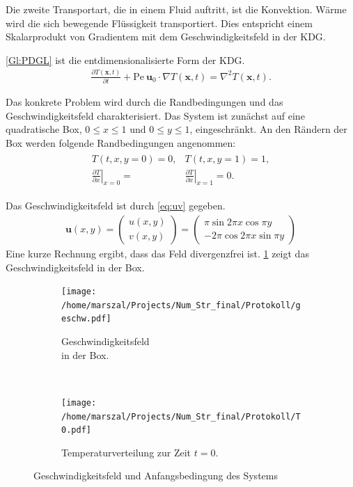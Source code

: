 Die zweite Transportart, die in einem Fluid auftritt, ist die Konvektion. Wärme wird die sich bewegende Flüssigkeit transportiert. Dies entspricht einem Skalarprodukt von Gradientem mit dem Geschwindigkeitsfeld in der KDG.

\cref{Gl:PDGL} ist die entdimensionalisierte Form der KDG.
\begin{align}
  \frac{\partial T(\boldsymbol x, t)}{\partial t} + \text{Pe}~ \boldsymbol{u}_0\cdot \nabla T(\boldsymbol x, t) = \nabla^2 T(\boldsymbol x, t). \label{Gl:PDGL}
\end{align}

Das konkrete Problem wird durch die Randbedingungen und das Geschwindigkeitsfeld charakterisiert.
Das System ist zunächst auf eine quadratische Box, $0\leq x \leq 1$ und $0\leq y \leq 1$, eingeschränkt.
An den Rändern der Box werden folgende Randbedingungen angenommen:
\begin{align}
  \begin{split}
  T(t,x,y=0) = 0, &  T(t,x,y=1)=1, \\
  \left.\frac{\partial T}{\partial x}\right|_{x=0} =& \left.\frac{\partial T}{\partial x}\right|_{x=1} = 0.
\end{split}
\end{align}

Das Geschwindigkeitsfeld ist durch \cref{eq:uv} gegeben.
\begin{align}
  \boldsymbol u(x,y) =
  \begin{pmatrix}
    u(x,y)\\
    v(x,y)
  \end{pmatrix} =
  \begin{pmatrix}
    \pi \sin{2\pi x}\cos{\pi y}\\
    -2\pi \cos{2\pi x}\sin{\pi y}
  \end{pmatrix}\label{eq:uv}
\end{align}
Eine kurze Rechnung ergibt, dass das Feld divergenzfrei ist. \cref{fig:uv} zeigt das Geschwindigkeitsfeld in der Box.
\begin{figure}
  \centering
  \begin{subfigure}[b]{0.45\textwidth}
  \texttt{[image: /home/marszal/Projects/Num\_Str\_final/Protokoll/geschw.pdf]}\caption{\centering Geschwindigkeitsfeld \\ in der Box.}\label{fig:uv}
  \end{subfigure}
  ~
  \begin{subfigure}[b]{0.45\textwidth}
  \texttt{[image: /home/marszal/Projects/Num\_Str\_final/Protokoll/T0.pdf]}\caption{\centering Temperaturverteilung zur Zeit $t=0$.}\label{fig:t0}
  \end{subfigure}
  \caption{Geschwindigkeitsfeld und Anfangsbedingung des Systems}
\end{figure}

